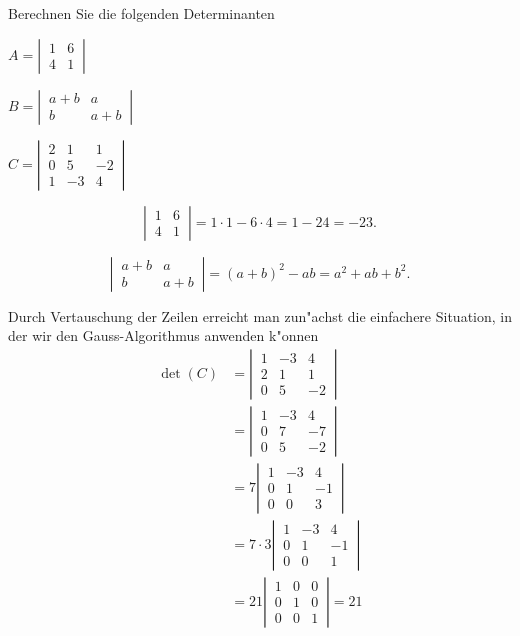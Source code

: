 Berechnen Sie die folgenden Determinanten
\begin{teilaufgaben}
\item $A=\left|\,\begin{matrix}1&6\\4&1\end{matrix}\,\right|$
\item $B=\left|\,\begin{matrix}a+b&a\\b&a+b\end{matrix}\,\right|$
\item $C=\left|\,\begin{matrix}2&1&1\\0&5&-2\\1&-3&4\end{matrix}\,\right|$
\end{teilaufgaben}

\begin{loesung}
\begin{teilaufgaben}
\item
\[
\left|\,\begin{matrix}1&6\\4&1\end{matrix}\,\right|=1\cdot 1-6\cdot 4=1-24=-23.
\]
\item
\[
\left|\,\begin{matrix}a+b&a\\b&a+b\end{matrix}\,\right|=(a+b)^2 -ab=a^2+ab+b^2.
\]
\item Durch Vertauschung der Zeilen erreicht man zun"achst die einfachere
Situation, in der wir den Gauss-Algorithmus anwenden k"onnen
\begin{align*}
\det(C)&=
\left|\,\begin{matrix}
1&-3&4\\
2&1&1\\
0&5&-2
\end{matrix}\,\right|
\\
&=
\left|\,\begin{matrix}
1&-3&4\\
0&7&-7\\
0&5&-2
\end{matrix}\,\right|
\\
&=
7\left|\,\begin{matrix}
1&-3&4\\
0&1&-1\\
0&0&3
\end{matrix}\,\right|
\\
&=
7\cdot 3
\left|\,\begin{matrix}
1&-3&4\\
0&1&-1\\
0&0&1
\end{matrix}\,\right|
\\
&=21
\left|\,\begin{matrix}
1&0&0\\
0&1&0\\
0&0&1
\end{matrix}\,\right|=21
\end{align*}

\end{teilaufgaben}
\end{loesung}
